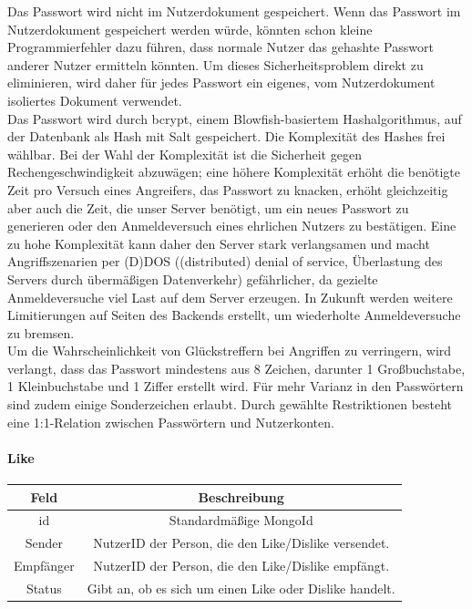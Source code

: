 Das Passwort wird nicht im Nutzerdokument gespeichert. Wenn das Passwort im Nutzerdokument gespeichert werden würde, könnten schon kleine Programmierfehler dazu führen, dass normale Nutzer das gehashte Passwort anderer Nutzer ermitteln könnten. Um dieses Sicherheitsproblem direkt zu eliminieren, wird daher für jedes Passwort ein eigenes, vom Nutzerdokument isoliertes Dokument verwendet.\\
Das Passwort wird durch bcrypt, einem Blowfish-basiertem Hashalgorithmus, auf der Datenbank als Hash mit Salt gespeichert. Die Komplexität des Hashes frei wählbar. Bei der Wahl der Komplexität ist die Sicherheit gegen Rechengeschwindigkeit abzuwägen; eine höhere Komplexität erhöht die benötigte Zeit pro Versuch eines Angreifers, das Passwort zu knacken, erhöht gleichzeitig aber auch die Zeit, die unser Server benötigt, um ein neues Passwort zu generieren oder den Anmeldeversuch eines ehrlichen Nutzers zu bestätigen. Eine zu hohe Komplexität kann daher den Server stark verlangsamen und macht Angriffszenarien per (D)DOS ((distributed) denial of service, Überlastung des Servers durch übermäßigen Datenverkehr) gefährlicher, da gezielte Anmeldeversuche viel Last auf dem Server erzeugen. In Zukunft werden weitere Limitierungen auf Seiten des Backends erstellt, um wiederholte Anmeldeversuche zu bremsen.\\
Um die Wahrscheinlichkeit von Glückstreffern bei Angriffen zu verringern, wird verlangt, dass das Passwort mindestens aus 8 Zeichen, darunter 1 Großbuchstabe, 1 Kleinbuchstabe und 1 Ziffer erstellt wird. Für mehr Varianz in den Passwörtern sind zudem einige Sonderzeichen erlaubt. Durch gewählte Restriktionen besteht eine 1:1-Relation zwischen Passwörtern und Nutzerkonten.

\paragraph{Like\\}
\begin{center}
    \begin{tabular}{ |c|c| }
        \hline
        Feld & Beschreibung  \\
        \hline
        id & Standardmäßige MongoId \\
        Sender & NutzerID der Person, die den Like/Dislike versendet. \\
        Empfänger &  NutzerID der Person, die den Like/Dislike empfängt. \\
        Status & Gibt an, ob es sich um einen Like oder Dislike handelt. \\
        \hline
    \end{tabular}
\end{center}


